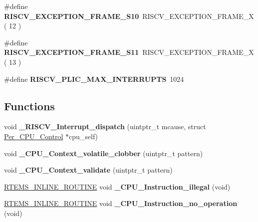 \begin{DoxyCompactItemize}
\#define {\bfseries R\+I\+S\+C\+V\+\_\+\+E\+X\+C\+E\+P\+T\+I\+O\+N\+\_\+\+F\+R\+A\+M\+E\+\_\+\+S10}~R\+I\+S\+C\+V\+\_\+\+E\+X\+C\+E\+P\+T\+I\+O\+N\+\_\+\+F\+R\+A\+M\+E\+\_\+X( 12 )
\item 
\mbox{\label{group__RTEMSScoreCPURISCV_ga55f2717304886f3cf0a9d923875e3485}} 
\#define {\bfseries R\+I\+S\+C\+V\+\_\+\+E\+X\+C\+E\+P\+T\+I\+O\+N\+\_\+\+F\+R\+A\+M\+E\+\_\+\+S11}~R\+I\+S\+C\+V\+\_\+\+E\+X\+C\+E\+P\+T\+I\+O\+N\+\_\+\+F\+R\+A\+M\+E\+\_\+X( 13 )
\item 
\mbox{\label{group__RTEMSScoreCPURISCV_ga4edfbf1dd4b4643754d35ecb84f44332}} 
\#define {\bfseries R\+I\+S\+C\+V\+\_\+\+P\+L\+I\+C\+\_\+\+M\+A\+X\+\_\+\+I\+N\+T\+E\+R\+R\+U\+P\+TS}~1024
\end{DoxyCompactItemize}
\subsection*{Functions}
\begin{DoxyCompactItemize}
\item 
\mbox{\label{group__RTEMSScoreCPURISCV_ga9fac3562f476d01e85bb610cded98024}} 
void {\bfseries \+\_\+\+R\+I\+S\+C\+V\+\_\+\+Interrupt\+\_\+dispatch} (uintptr\+\_\+t mcause, struct \mbox{\hyperlink{structPer__CPU__Control}{Per\+\_\+\+C\+P\+U\+\_\+\+Control}} $\ast$cpu\+\_\+self)
\item 
\mbox{\label{group__RTEMSScoreCPURISCV_gad26becade17fbdbb0bdf63c6b9228688}} 
void {\bfseries \+\_\+\+C\+P\+U\+\_\+\+Context\+\_\+volatile\+\_\+clobber} (uintptr\+\_\+t pattern)
\item 
\mbox{\label{group__RTEMSScoreCPURISCV_ga3adb94b8d32fd0e3058934ffd3df6d90}} 
void {\bfseries \+\_\+\+C\+P\+U\+\_\+\+Context\+\_\+validate} (uintptr\+\_\+t pattern)
\item 
\mbox{\label{group__RTEMSScoreCPURISCV_ga07618c93359f2485af2e98a96b330208}} 
\mbox{\hyperlink{group__RTEMSScoreBaseDefs_gac216239df231d5dbd15e3520b0b9313f}{R\+T\+E\+M\+S\+\_\+\+I\+N\+L\+I\+N\+E\+\_\+\+R\+O\+U\+T\+I\+NE}} void {\bfseries \+\_\+\+C\+P\+U\+\_\+\+Instruction\+\_\+illegal} (void)
\item 
\mbox{\label{group__RTEMSScoreCPURISCV_gab683a0a37a089e2a0fd3c356836d5499}} 
\mbox{\hyperlink{group__RTEMSScoreBaseDefs_gac216239df231d5dbd15e3520b0b9313f}{R\+T\+E\+M\+S\+\_\+\+I\+N\+L\+I\+N\+E\+\_\+\+R\+O\+U\+T\+I\+NE}} void {\bfseries \+\_\+\+C\+P\+U\+\_\+\+Instruction\+\_\+no\+\_\+operation} (void)
\end{DoxyCompactItemize}
